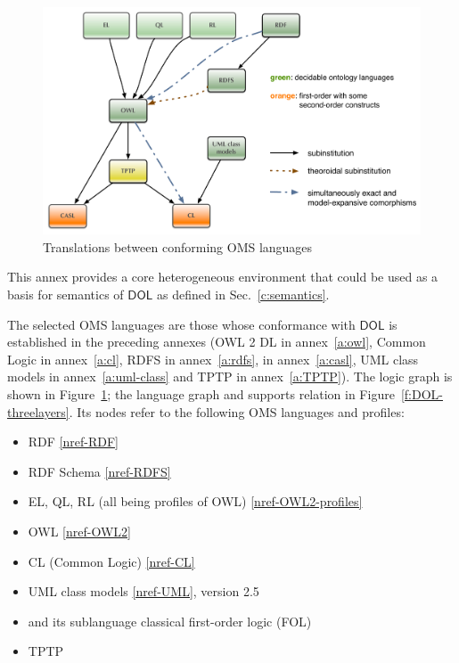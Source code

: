 \documentclass[10pt, a4paper]{isov2}
\newcommand*{\DOL}{\ensuremath{\mathsf{DOL}}\xspace}
\renewcommand{\annexrefname}{annex}
\renewcommand{\figurerefname}{Figure}
\renewcommand{\noterefname}{note}
\renewcommand{\aref}[1]{\annexrefname~\ref{#1}}
\renewcommand{\fref}[1]{\figurerefname~\ref{#1}}
\renewcommand{\nref}[1]{\noterefname~\ref{#1}}
\renewcommand{\nref}[1]{\ref{nref-#1}}
\begin{document}
\begin{figure}
  \centering
  \includegraphics[width=\textwidth]{illustrations/ontograph-standards-new}
  \caption{Translations between conforming OMS languages}
  \label{fig:ontograph-standards}
\end{figure}

This annex provides a core heterogeneous environment that could be used as a basis for 
semantics of \DOL as defined in Sec.~\ref{c:semantics}.




The selected OMS languages are those whose conformance with \DOL is
established in the preceding annexes (OWL 2 DL in \aref{a:owl}, Common
Logic in \aref{a:cl}, RDFS in \aref{a:rdfs}, \CASL in \aref{a:casl}, UML
class models in \aref{a:uml-class} and TPTP in \aref{a:TPTP}).  The
logic graph is shown in \fref{fig:ontograph-standards}; the language
graph and supports relation in \fref{f:DOL-threelayers}.  Its nodes
refer to the following OMS languages and profiles:
 \begin{itemize} 
\item RDF \nref{RDF}
\item RDF Schema \nref{RDFS}
\item EL, QL, RL (all being profiles of OWL) \nref{OWL2-profiles}
\item OWL \nref{OWL2}
\item CL (Common Logic) \nref{CL}
\item UML class models \nref{UML}, version 2.5
\item \CASL \cite{CASL-RM} and its sublanguage classical first-order logic (FOL)
\item TPTP
 \end{itemize} 
\end{document}
